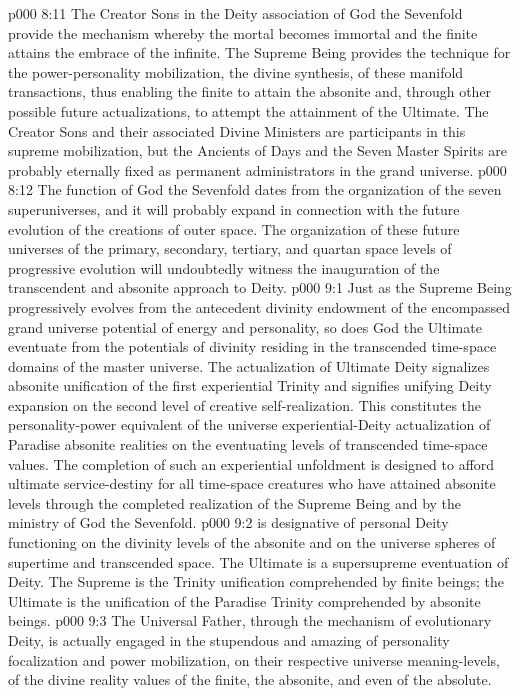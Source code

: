 \vs p000 8:11 The Creator Sons in the Deity association of God the Sevenfold provide the mechanism whereby the mortal becomes immortal and the finite attains the embrace of the infinite. The Supreme Being provides the technique for the power\hyp{}personality mobilization, the divine synthesis, of  these manifold transactions, thus enabling the finite to attain the absonite and, through other possible future actualizations, to attempt the attainment of the Ultimate. The Creator Sons and their associated Divine Ministers are participants in this supreme mobilization, but the Ancients of Days and the Seven Master Spirits are probably eternally fixed as permanent administrators in the grand universe.
\vs p000 8:12 The function of God the Sevenfold dates from the organization of the seven superuniverses, and it will probably expand in connection with the future evolution of the creations of outer space. The organization of these future universes of the primary, secondary, tertiary, and quartan space levels of progressive evolution will undoubtedly witness the inauguration of the transcendent and absonite approach to Deity.
\vs p000 9:1 Just as the Supreme Being progressively evolves from the antecedent divinity endowment of the encompassed grand universe potential of energy and personality, so does God the Ultimate eventuate from the potentials of divinity residing in the transcended time\hyp{}space domains of the master universe. The actualization of Ultimate Deity signalizes absonite unification of the first experiential Trinity and signifies unifying Deity expansion on the second level of creative self\hyp{}realization. This constitutes the personality\hyp{}power equivalent of the universe experiential\hyp{}Deity actualization of Paradise absonite realities on the eventuating levels of transcended time\hyp{}space values. The completion of such an experiential unfoldment is designed to afford ultimate service\hyp{}destiny for all time\hyp{}space creatures who have attained absonite levels through the completed realization of the Supreme Being and by the ministry of God the Sevenfold.
\vs p000 9:2 \pc {} is designative of personal Deity functioning on the divinity levels of the absonite and on the universe spheres of supertime and transcended space. The Ultimate is a supersupreme eventuation of Deity. The Supreme is the Trinity unification comprehended by finite beings; the Ultimate is the unification of the Paradise Trinity comprehended by absonite beings.
\vs p000 9:3 The Universal Father, through the mechanism of evolutionary Deity, is actually engaged in the stupendous and amazing  of personality focalization and power mobilization, on their respective universe meaning\hyp{}levels, of the divine reality values of the finite, the absonite, and even of the absolute.
